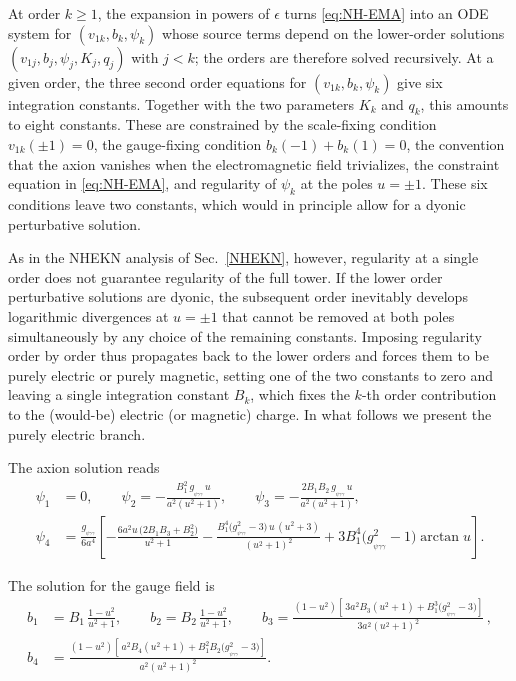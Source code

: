 \documentclass[11pt]{article}
\numberwithin{equation}{section} %
\begin{document}
At order $k\geq 1$, the expansion in powers of $\epsilon$ turns \eqref{eq:NH-EMA} into an ODE system for $(v_{1k},b_k,\psi_k)$ whose source terms depend on the lower-order solutions $(v_{1j},b_j,\psi_j,K_j,q_j)$ with $j<k$; the orders are therefore solved recursively. At a given order, the three second order equations for $(v_{1k},b_k,\psi_k)$ give six integration constants. Together with the two parameters $K_k$ and $q_k$, this amounts to eight constants. These are constrained by the scale-fixing condition $v_{1k}(\pm1)=0$, the gauge-fixing condition $b_k(-1)+b_k(1)=0$, the convention that the axion vanishes when the electromagnetic field trivializes, the constraint equation in \eqref{eq:NH-EMA}, and regularity of $\psi_k$ at the poles $u=\pm1$. These six conditions leave two constants, which would in principle allow for a dyonic perturbative solution. 

As in the NHEKN analysis of Sec.~\ref{NHEKN}, however, regularity at a single order does not guarantee regularity of the full tower. If the lower order perturbative solutions are dyonic, the subsequent order inevitably develops logarithmic divergences at $u=\pm1$ that cannot be removed at both poles simultaneously by any choice of the remaining constants. Imposing regularity order by order thus propagates back to the lower orders and forces them to be purely electric or purely magnetic, setting one of the two constants to zero and leaving a single integration constant $B_k$, which fixes the $k$-th order contribution to the (would-be) electric (or magnetic) charge. In what follows we present the purely electric branch.


The axion solution reads
%
\begin{equation}
\begin{aligned}
\psi_{1} &= 0,\qquad
\psi_{2} = -\frac{B_{1}^{2}\,g_{_{\psi\gamma\gamma}}\,u}{a^{2}(u^{2}+1)},\qquad
\psi_{3} = -\frac{2 B_{1} B_{2}\,g_{_{\psi\gamma\gamma}}\,u}{a^{2}(u^{2}+1)},\\
\psi_{4} &= \frac{g_{_{\psi\gamma\gamma}}}{6 a^{4}}\!\left[
-\frac{6 a^{2} u\,\bigl(2 B_{1} B_{3}+B_{2}^{2}\bigr)}{u^{2}+1}
-\frac{B_{1}^{4}\bigl(g_{_{\psi\gamma\gamma}}^{2}-3\bigr)\,u\,(u^{2}+3)}{(u^{2}+1)^{2}}
+ 3 B_{1}^{4}\bigl(g_{_{\psi\gamma\gamma}}^{2}-1\bigr)\arctan u
\right]\!.
\end{aligned}
\end{equation}

The solution for the gauge field is
%
\begin{equation}
\begin{aligned}
b_{1} &= B_{1}\,\frac{1-u^{2}}{u^{2}+1},\qquad
b_{2} = B_{2}\,\frac{1-u^{2}}{u^{2}+1},\qquad  b_{3} = \frac{(1-u^{2})\!\left[\,3 a^{2} B_{3}(u^{2}+1) + B_{1}^{3}\bigl(g_{_{\psi\gamma\gamma}}^{2}-3\bigr)\right]}{3 a^{2}(u^{2}+1)^{2}}\,,\\
b_{4} &= \frac{(1-u^{2})\!\left[\,a^{2} B_{4}(u^{2}+1) + B_{1}^{2} B_{2}\bigl(g_{_{\psi\gamma\gamma}}^{2}-3\bigr)\right]}{a^{2}(u^{2}+1)^{2}}.
\end{aligned}
\end{equation}
\end{document}
